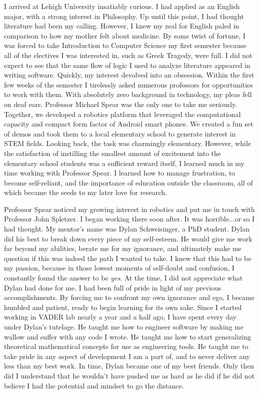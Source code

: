 \documentclass[10pt]{article}
\begin{document}
I arrived at Lehigh University insatiably curious. I had applied as an English
major, with a strong interest in Philosophy.  Up until this point, I had
thought literature had been my calling. However, I knew my zeal for English
paled in comparison to how my mother felt about medicine. By some twist of
fortune, I was forced to take Introduction to Computer Science my first
semester because all of the electives I was interested in, such as Greek
Tragedy, were full. I did not expect to see that the same flow of logic I used
to analyze literature appeared in writing software. Quickly, my interest
devolved into an obsession.  Within the first few weeks of the semester I
tirelessly asked numerous professors for opportunities to work with them.  With
absolutely zero background in technology, my pleas fell on deaf ears.
Professor Michael Spear was the only one to take me seriously. Together, we
developed a robotics platform that leveraged the computational capacity and
compact form factor of Android smart phones. We created a fun set of demos and
took them to a local elementary school to generate interest in STEM fields.
Looking back, the task was charmingly elementary. However, while the
satisfaction of instilling the smallest amount of excitement into the
elementary school students was a sufficient reward itself, I learned much in my
time working with Professor Spear.  I learned how to manage frustration, to
become self-reliant, and the importance of education outside the classroom, all
of which became the seeds to my later love for research.

Professor Spear noticed my growing interest in robotics and put me in touch
with Professor John Spletzer. I began working there soon after. It was
horrible...or so I had thought. My mentor's name was Dylan Schweisinger, a PhD
student. Dylan did his best to break down every piece of my self-esteem. He
would give me work far beyond my abilities, berate me for my ignorance, and
ultimately make me question if this was indeed the path I wanted to take. I
knew that this had to be my passion, because in those lowest moments of
self-doubt and confusion, I constantly found the answer to be \emph{yes}. At
the time, I did not appreciate what Dylan had done for me. I had been full of
pride in light of my previous accomplishments. By forcing me to confront my own
ignorance and ego, I became humbled and patient, ready to begin learning for
its own sake. Since I started working in VADER lab nearly a year and a half
ago, I have spent every day under Dylan's tutelage.  He taught me how to
engineer software by making me wallow and suffer with any code I wrote. He
taught me how to start generalizing theoretical mathematical concepts for use
as engineering tools. He taught me to take pride in any aspect of development I
am a part of, and to never deliver any less than my best work. In time, Dylan
became one of my best friends. Only then did I understand that he wouldn't have
pushed me as hard as he did if he did not believe I had the potential and
mindset to go the distance.
\end{document}
